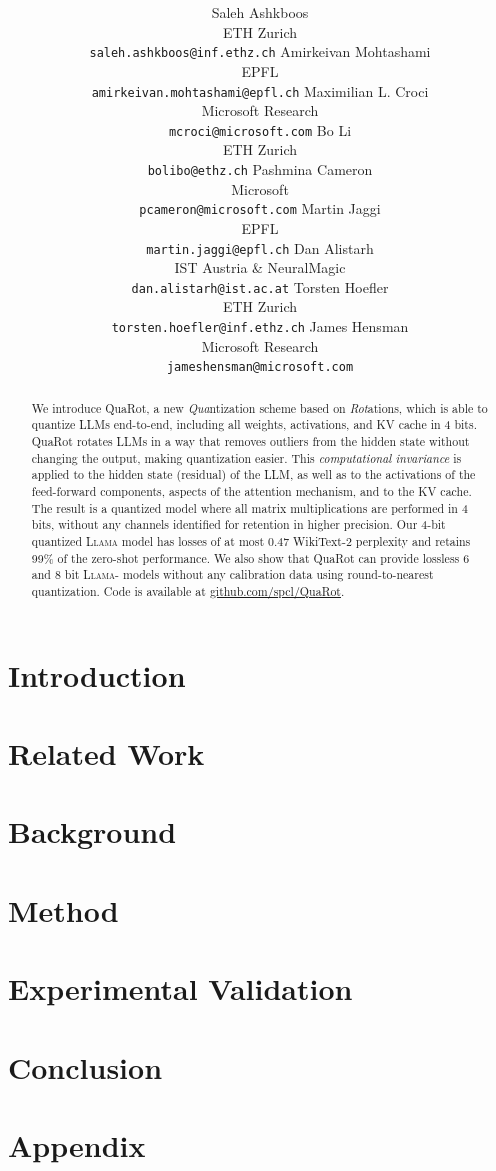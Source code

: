 \documentclass{article}
\title{\carrot~\scalebox{0.92}{QuaRot: Outlier-Free 4-Bit Inference in  Rotated LLMs}}
\author{
    Saleh Ashkboos\\
    ETH Zurich \\
    \texttt{saleh.ashkboos@inf.ethz.ch}
    \And
    Amirkeivan Mohtashami\\
    EPFL\\
    \texttt{amirkeivan.mohtashami@epfl.ch}
    \And
    Maximilian L. Croci \\
    Microsoft Research \\
    \texttt{mcroci@microsoft.com}
    \And
    Bo Li \\
    ETH Zurich \\
    \texttt{bolibo@ethz.ch}
    \And
    Pashmina Cameron \\
    Microsoft \\
    \texttt{pcameron@microsoft.com}
    \And
    Martin Jaggi\\
    EPFL\\
    \texttt{martin.jaggi@epfl.ch}
    \And
    Dan Alistarh \\
    IST Austria \& NeuralMagic \\
    \texttt{dan.alistarh@ist.ac.at}
    \And
    Torsten Hoefler  \\
    ETH Zurich\\
    \texttt{torsten.hoefler@inf.ethz.ch}
    \And
    James Hensman\\
    Microsoft Research\\
    \texttt{jameshensman@microsoft.com}\\
}
\newcommand{\llama}{\textsc{Llama-\scalebox{0.95}{2}} }
\newcommand{\llamaBig}{\textsc{Llama\scalebox{0.9}{2-70B}} }
\newcommand{\wiki}{WikiText-2 }
\begin{document}
\let\oldthepage\thepage
\maketitle

\begin{abstract}
We introduce QuaRot, a new \emph{Qua}ntization scheme based on \emph{Rot}ations, which is able to quantize LLMs end-to-end, including all weights, activations, and KV cache in 4 bits. QuaRot rotates LLMs in a way that removes outliers from the hidden state without changing the output, making quantization easier. This \emph{computational invariance} is applied to the hidden state (residual) of the LLM, as well as to the activations of the feed-forward components, aspects of the attention mechanism, and to the KV cache. The result is a quantized model where all matrix multiplications are performed in 4 bits, without any channels identified for retention in higher precision. Our 4-bit quantized \llamaBig model has losses of at most 0.47 \wiki perplexity and retains 99\% of the zero-shot performance. We also show that QuaRot can provide lossless 6 and 8 bit \llama models without any calibration data using round-to-nearest quantization. 
Code is available at \url{github.com/spcl/QuaRot}. 
\end{abstract}

\section{Introduction}
\label{sec:intro}



\section{Related Work}
\label{sec:related_work}


\section{Background}
\label{sec:background}


\section{Method}
\label{sec:method}



\section{Experimental Validation}
\label{sec:experiments}


\section{Conclusion}
\label{sec:conclusions}







\clearpage
\appendix
\section{Appendix}
\label{sec:appendix}


% 

\end{document}
